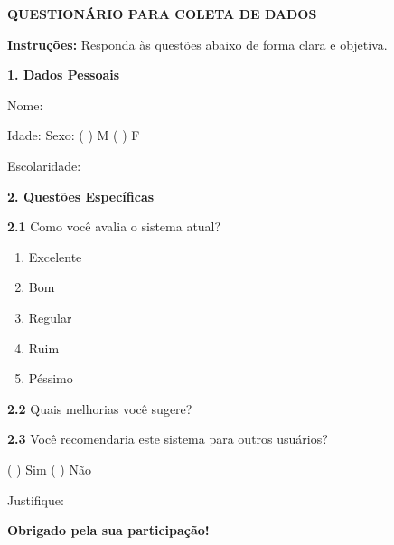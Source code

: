 
\textbf{QUESTIONÁRIO PARA COLETA DE DADOS}

\textbf{Instruções:} Responda às questões abaixo de forma clara e objetiva.

\textbf{1. Dados Pessoais}

Nome: \underline{\hspace{8cm}}

Idade: \underline{\hspace{3cm}} Sexo: ( ) M ( ) F

Escolaridade: \underline{\hspace{6cm}}

\textbf{2. Questões Específicas}

\textbf{2.1} Como você avalia o sistema atual?
\begin{enumerate}[label=(\alph*)]
    \item Excelente
    \item Bom
    \item Regular
    \item Ruim
    \item Péssimo
\end{enumerate}

\textbf{2.2} Quais melhorias você sugere?

\underline{\hspace{\textwidth}}

\underline{\hspace{\textwidth}}

\underline{\hspace{\textwidth}}

\textbf{2.3} Você recomendaria este sistema para outros usuários?

( ) Sim ( ) Não

Justifique: \underline{\hspace{10cm}}

\underline{\hspace{\textwidth}}

\textbf{Obrigado pela sua participação!}
